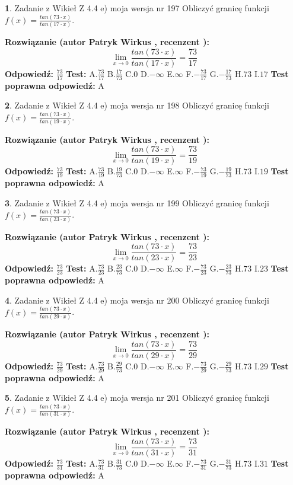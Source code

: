 \documentclass[12pt, a4paper]{article}
\theoremstyle{definition} %
\newtheorem{zad}{}
\newcommand{\zadStart}[1]{\begin{zad}#1\newline}
\newcommand{\zadStop}{\end{zad}}
\newcommand{\rozwStart}[2]{\noindent \textbf{Rozwiązanie (autor #1 , recenzent #2): }\newline}
\newcommand{\rozwStop}{\newline}
\newcommand{\odpStart}{\noindent \textbf{Odpowiedź:}\newline}
\newcommand{\odpStop}{\newline}
\newcommand{\testStart}{\noindent \textbf{Test:}\newline}
\newcommand{\testStop}{\newline}
\newcommand{\kluczStart}{\noindent \textbf{Test poprawna odpowiedź:}\newline}
\newcommand{\kluczStop}{\newline}
\begin{document}
\zadStart{Zadanie z Wikieł Z 4.4 e) moja wersja nr 197}
Obliczyć granicę funkcji $f(x)=\frac{tan(73\cdot x)}{tan(17\cdot x)}$.
\zadStop
\rozwStart{Patryk Wirkus}{}
$$\lim\limits_{x\to 0}\frac{tan(73\cdot x)}{tan(17\cdot x)}=
\frac{73}{17}$$
\rozwStop
\odpStart
$\frac{73}{17}$
\odpStop
\testStart
A.$\frac{73}{17}$
B.$\frac{17}{73}$
C.$0$
D.$-\infty$
E.$\infty$
F.$-\frac{73}{17}$
G.$-\frac{17}{73}$
H.$73$
I.$17$
\testStop
\kluczStart
A
\kluczStop



\zadStart{Zadanie z Wikieł Z 4.4 e) moja wersja nr 198}
Obliczyć granicę funkcji $f(x)=\frac{tan(73\cdot x)}{tan(19\cdot x)}$.
\zadStop
\rozwStart{Patryk Wirkus}{}
$$\lim\limits_{x\to 0}\frac{tan(73\cdot x)}{tan(19\cdot x)}=
\frac{73}{19}$$
\rozwStop
\odpStart
$\frac{73}{19}$
\odpStop
\testStart
A.$\frac{73}{19}$
B.$\frac{19}{73}$
C.$0$
D.$-\infty$
E.$\infty$
F.$-\frac{73}{19}$
G.$-\frac{19}{73}$
H.$73$
I.$19$
\testStop
\kluczStart
A
\kluczStop



\zadStart{Zadanie z Wikieł Z 4.4 e) moja wersja nr 199}
Obliczyć granicę funkcji $f(x)=\frac{tan(73\cdot x)}{tan(23\cdot x)}$.
\zadStop
\rozwStart{Patryk Wirkus}{}
$$\lim\limits_{x\to 0}\frac{tan(73\cdot x)}{tan(23\cdot x)}=
\frac{73}{23}$$
\rozwStop
\odpStart
$\frac{73}{23}$
\odpStop
\testStart
A.$\frac{73}{23}$
B.$\frac{23}{73}$
C.$0$
D.$-\infty$
E.$\infty$
F.$-\frac{73}{23}$
G.$-\frac{23}{73}$
H.$73$
I.$23$
\testStop
\kluczStart
A
\kluczStop



\zadStart{Zadanie z Wikieł Z 4.4 e) moja wersja nr 200}
Obliczyć granicę funkcji $f(x)=\frac{tan(73\cdot x)}{tan(29\cdot x)}$.
\zadStop
\rozwStart{Patryk Wirkus}{}
$$\lim\limits_{x\to 0}\frac{tan(73\cdot x)}{tan(29\cdot x)}=
\frac{73}{29}$$
\rozwStop
\odpStart
$\frac{73}{29}$
\odpStop
\testStart
A.$\frac{73}{29}$
B.$\frac{29}{73}$
C.$0$
D.$-\infty$
E.$\infty$
F.$-\frac{73}{29}$
G.$-\frac{29}{73}$
H.$73$
I.$29$
\testStop
\kluczStart
A
\kluczStop



\zadStart{Zadanie z Wikieł Z 4.4 e) moja wersja nr 201}
Obliczyć granicę funkcji $f(x)=\frac{tan(73\cdot x)}{tan(31\cdot x)}$.
\zadStop
\rozwStart{Patryk Wirkus}{}
$$\lim\limits_{x\to 0}\frac{tan(73\cdot x)}{tan(31\cdot x)}=
\frac{73}{31}$$
\rozwStop
\odpStart
$\frac{73}{31}$
\odpStop
\testStart
A.$\frac{73}{31}$
B.$\frac{31}{73}$
C.$0$
D.$-\infty$
E.$\infty$
F.$-\frac{73}{31}$
G.$-\frac{31}{73}$
H.$73$
I.$31$
\testStop
\kluczStart
A
\kluczStop
\end{document}
